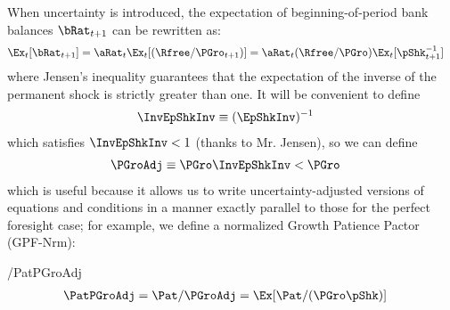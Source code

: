 \documentclass[BufferStockTheory]{subfiles}
\providecommand{\LtxDir}{LaTeX/}
\begin{document}
When uncertainty is introduced, the expectation of beginning-of-period bank balances $\bRat_{t+1}$ can be rewritten as:  
\begin{align}
  \Ex_{t}[\bRat_{t+1}]  & =  \aRat_{t}\Ex_{t}[(\Rfree/\PGro_{t+1})] = \aRat_{t}(\Rfree/\PGro)\Ex_{t}[\pShk_{t+1}^{-1}] \label{eq:EbRat}
\end{align}
where Jensen's inequality guarantees that the expectation of the inverse of the permanent shock is strictly greater than one.  It will be convenient to define\hypertarget{InvEpShkInv}{}
\begin{align}
  \InvEpShkInv  & \equiv  (\EpShkInv)^{-1} \label{eq:InvEpShkInv}
\end{align}
which satisfies $\InvEpShkInv < 1$ (thanks to Mr. Jensen), so we can define
\begin{align}
      \PGroAdj & \equiv \PGro \InvEpShkInv < \PGro \label{eq:PGroAdj}
\end{align}
which is useful because it allows us to write uncertainty-adjusted versions of equations and conditions in a manner exactly parallel to those for the perfect foresight case; for example, we define a normalized Growth Patience Pactor (GPF-Nrm):
\hypertarget{GICNrm}{}\hypertarget{GICNrmI}{}\hypertarget{PermGroAdj}{}
\begin{verbatimwrite}{\EqDir/PatPGroAdj}
  \begin{align}
    \PatPGroAdj  & = \Pat/\PGroAdj = \Ex[\Pat/(\PGro\pShk)]  \label{eq:GPFNrm} 
  \end{align}
\end{verbatimwrite}

\begin{comment}
and the proof of Theorem~\ref{thm:balance} below yields the conclusion that
\begin{align*}
  \lim_{\mRat_{t} \rightarrow \infty} \Ex_{t}[\mRat_{t+1}/\mRat_{t}]  & = \PatPGroAdj,
\end{align*}
which implies that if we wish to prevent $\mRat$ from heading to infinity (that is, if we want $\mRat$ to be expected to fall for some large enough value of $m$) we must impose a modified version of the Growth Impatience Condition \eqref{eq:GICRaw}; we call the `Normalized Growth Impatience Condition' (\GICNrm) the requirement that the Normalized Growth Patience Factor~\eqref{eq:GPFNrm} must be less than 1:\footnote{Under our assumption that $\CRRA>1$, equation \eqref{eq:GICNrm} is a bit easier to satisfy than the similar condition imposed by Deaton~\citeyearpar{deatonLiqConstr}: $\left(\Ex[\pShk^{-\CRRA}]\right)^{1/\CRRA} \PatPGro < 1$ to guarantee that his problem defined a contraction mapping.}
\end{comment}
\end{document}
